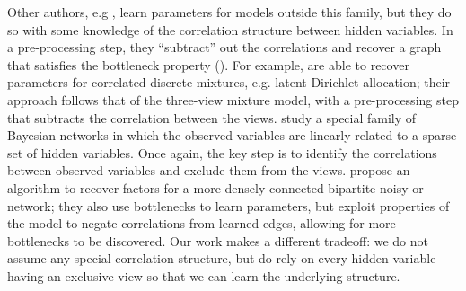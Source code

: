 
Other authors, e.g \citet{anandkumar12lda, anandkumar2013linear,
  halpern13noisyor}, learn parameters for models outside this
  family, but they do so with some knowledge of the correlation structure
  between hidden variables. 
In a pre-processing step, they ``subtract'' out the correlations and
  recover a graph that satisfies the bottleneck property
  ().
%
For example,
\citet{anandkumar12lda} are able to recover parameters for correlated
  discrete mixtures, e.g. latent Dirichlet allocation; their approach
  follows that of the three-view mixture model, with a pre-processing step
  that subtracts the correlation between the views.
\citet{anandkumar2013linear} study a special family of Bayesian networks
  in which the observed variables are linearly related to a sparse set of
  hidden variables. Once again, the key step is to identify the
  correlations between observed variables and exclude them from the views.
\citet{halpern13noisyor} propose an algorithm to recover factors for
  a more densely connected bipartite noisy-or network; they also use
  bottlenecks to learn parameters, but exploit properties of the model
  to negate correlations from learned edges, allowing for more
  bottlenecks to be discovered. 
Our work makes a different tradeoff: we do not assume any special correlation structure,
but do rely on every hidden variable having an exclusive view so that we can
learn the underlying structure.



